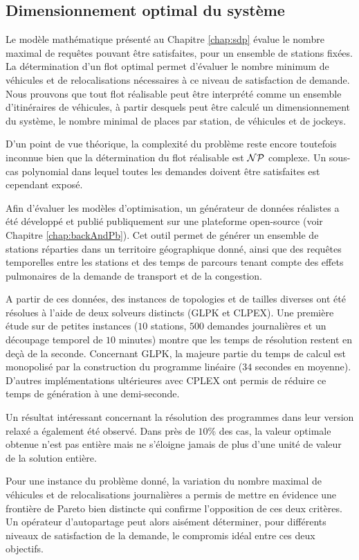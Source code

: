 \subsection*{Dimensionnement optimal du système}
Le modèle mathématique présenté au Chapitre \ref{chap:sdp} évalue le nombre maximal de requêtes pouvant être satisfaites, pour un ensemble de stations fixées.
La détermination d'un flot optimal permet d'évaluer le nombre minimum de véhicules et de relocalisations nécessaires à ce niveau de satisfaction de demande.
Nous prouvons que tout flot réalisable peut être interprété comme un ensemble d'itinéraires de véhicules, à partir desquels peut être calculé un dimensionnement du système, \ie le nombre minimal de places par station, de véhicules et de jockeys.

\medskip
D'un point de vue théorique, la complexité du problème reste encore toutefois inconnue bien que la détermination du flot réalisable est ${\cal NP}$ complexe.
Un sous-cas polynomial dans lequel toutes les demandes doivent être satisfaites est cependant exposé.

\medskip
Afin d'évaluer les modèles d'optimisation, un générateur de données réalistes a été développé et publié publiquement sur une plateforme open-source (voir Chapitre \ref{chap:backAndPb}).
Cet outil permet de générer un ensemble de stations réparties dans un territoire géographique donné, ainsi que des requêtes temporelles entre les stations et des temps de parcours tenant compte des effets pulmonaires de la demande de transport et de la congestion.

A partir de ces données, des instances de topologies et de tailles diverses ont été résolues à l'aide de deux solveurs distincts (GLPK et CLPEX).
Une première étude sur de petites instances (\ie $10$ stations, $500$ demandes journalières et un découpage temporel de $10$ minutes) montre que les temps de résolution restent en deçà de la seconde.
Concernant GLPK, la majeure partie du temps de calcul est monopolisé par la construction du programme linéaire ($34$ secondes en moyenne).
D'autres implémentations ultérieures avec CPLEX ont permis de réduire ce temps de génération à une demi-seconde.

\medskip
Un résultat intéressant concernant la résolution des programmes dans leur version relaxé a également été observé.
Dans près de $10$\% des cas, la valeur optimale obtenue n'est pas entière mais ne s'éloigne jamais de plus d'une unité de valeur de la solution entière.

\medskip
Pour une instance du problème donné, la variation du nombre maximal de véhicules et de relocalisations journalières a permis de mettre en évidence une frontière de Pareto bien distincte qui confirme l'opposition de ces deux critères.
Un opérateur d'autopartage peut alors aisément déterminer, pour différents niveaux de satisfaction de la demande, le compromis idéal entre ces deux objectifs.

